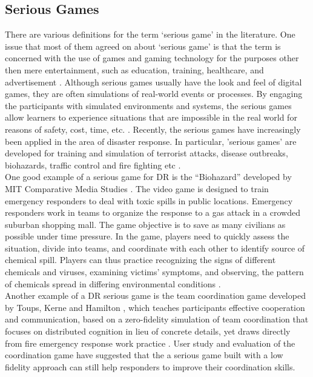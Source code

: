 \subsection{Serious Games}
There are various definitions for the term `serious game' in the literature. One issue that most of them agreed on about `serious game' is that the term is concerned with the use of games and gaming technology for the purposes other then mere entertainment, such as education, training, healthcare, and advertisement \citep{Susi2007}. Although serious games usually have the look and feel of digital games, they are often simulations of real-world events or processes. By engaging the participants with simulated environments and systems, the serious games allow learners to experience situations that are impossible in the real world for reasons of safety, cost, time, etc. \citep{Squire2003,Meesters2013}. Recently, the serious games have increasingly been applied in the area of disaster response. In particular, 'serious games' are developed for training and simulation of terrorist attacks, disease outbreaks, biohazards, traffic control and fire fighting etc \citep{Susi2007,Squire2003}. \\

One good example of a serious game for \ac{DR} is the ``Biohazard'' developed by MIT Comparative Media Studies \citep{Squire2003}. The video game is designed to train emergency responders to deal with toxic spills in public locations. Emergency responders work in teams to organize the response to a gas attack in a crowded suburban shopping mall. The game objective is to save as many civilians as possible under time pressure. In the game,  players need to quickly assess the situation, divide into teams, and coordinate with each other to identify source of chemical spill. Players can thus practice recognizing the signs of different chemicals and viruses, examining victims' symptoms, and observing, the pattern of chemicals spread in differing environmental conditions \citep{Susi2007}.\\


Another example of a \ac{DR} serious game is the team coordination game developed by Toups, Kerne and Hamilton \citep{Toups2011}, which teaches participants effective cooperation and communication, based on a zero-fidelity simulation of team coordination that focuses on distributed cognition in lieu of concrete details, yet draws directly from fire emergency response work practice \citep{Toups2011}. User study and evaluation of the coordination game have suggested that the a serious game built with a low fidelity approach can still help responders to improve their coordination skills.\\

